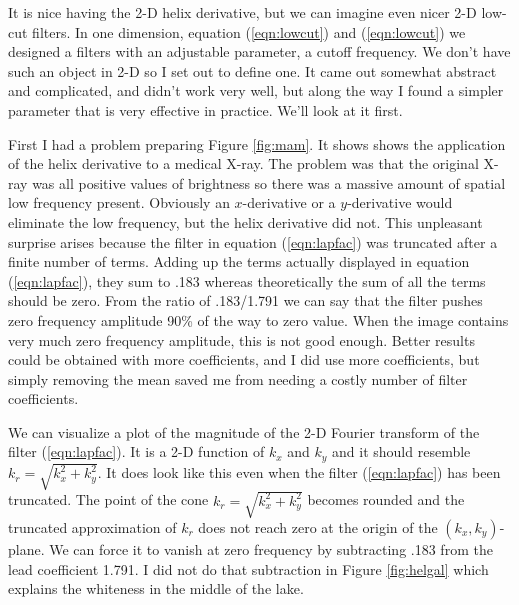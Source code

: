 
\par
It is nice having the 2-D helix derivative,
but we can imagine even nicer 2-D low-cut filters.
In one dimension,
equation 
(\ref{eqn:lowcut})
and
(\ref{eqn:lowcut})
we designed a filters with an adjustable parameter,
a cutoff frequency.
We don't have such an object in 2-D so
I set out to define one.
It came out somewhat
abstract and complicated,
and didn't work very well, 
but along the way
I found a simpler parameter that is very effective in practice.
We'll look at it first.


\par
First I had a problem preparing Figure \ref{fig:mam}.
It shows shows the application of the helix derivative
to a medical X-ray.
The problem was that the original X-ray was all positive
values of brightness so there was a massive amount of
spatial low frequency present.
Obviously an $x$-derivative or a $y$-derivative would
eliminate the low frequency, but the helix derivative did not.
This unpleasant surprise arises
because the filter in equation
(\ref{eqn:lapfac})
was truncated after a finite number of terms.
Adding up the terms actually displayed in equation
(\ref{eqn:lapfac}),
they sum to .183 whereas theoretically the sum of all the terms should be zero.
From the ratio of .183/1.791 we can say that the filter
pushes zero frequency amplitude 90\% of the way to zero value.
When the image contains very much zero frequency amplitude,
this is not good enough.
Better results could be obtained with more coefficients,
and I did use more coefficients,
but simply removing the mean saved me
from needing a costly number of filter coefficients.


\par
We can visualize a plot of the magnitude of the 2-D
Fourier transform of the filter
(\ref{eqn:lapfac}).
It is a 2-D function of $k_x$ and $k_y$ and it should
resemble $k_r=\sqrt{k_x^2+k_y^2}$.
It does look like this even when the filter
(\ref{eqn:lapfac})
has been truncated.
The point of the cone $k_r=\sqrt{k_x^2+k_y^2}$ becomes
rounded and the truncated approximation of
$k_r$ does not reach zero at the origin of the $(k_x,k_y)$-plane.
We can force it to vanish at zero frequency
by subtracting .183 from the lead coefficient 1.791.
I did not do that subtraction in Figure
\ref{fig:helgal}
which explains the whiteness in the middle of the lake.

